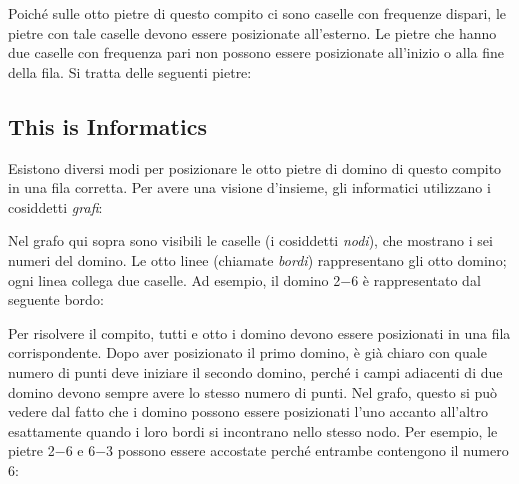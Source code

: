 \documentclass[a4paper,11pt]{report}
\newcommand{\taskGraphicsFolder}{..}
\begin{document}
{\centering%
\par}

Poiché sulle otto pietre di questo compito ci sono caselle con frequenze dispari, le pietre con tale caselle devono essere posizionate all’esterno. Le pietre che hanno due caselle con frequenza pari non possono essere posizionate all’inizio o alla fine della fila. Si tratta delle seguenti pietre:

{\centering%
\par}


\subsection*{This is Informatics}

Esistono diversi modi per posizionare le otto pietre di domino di questo compito in una fila corretta. Per avere una visione d’insieme, gli informatici utilizzano i cosiddetti \emph{grafi}:

{\centering%
\par}

Nel grafo qui sopra sono visibili le caselle (i cosiddetti \emph{nodi}), che mostrano i sei numeri del domino. Le otto linee (chiamate \emph{bordi}) rappresentano gli otto domino; ogni linea collega due caselle. Ad esempio, il domino 2$-6$ è rappresentato dal seguente bordo:

{\centering%
\par}

Per risolvere il compito, tutti e otto i domino devono essere posizionati in una fila corrispondente. Dopo aver posizionato il primo domino, è già chiaro con quale numero di punti deve iniziare il secondo domino, perché i campi adiacenti di due domino devono sempre avere lo stesso numero di punti. Nel grafo, questo si può vedere dal fatto che i domino possono essere posizionati l’uno accanto all’altro esattamente quando i loro bordi si incontrano nello stesso nodo. Per esempio, le pietre 2$-6$ e 6$-3$ possono essere accostate perché entrambe contengono il numero $6$:

{\centering%
\par}
\end{document}

